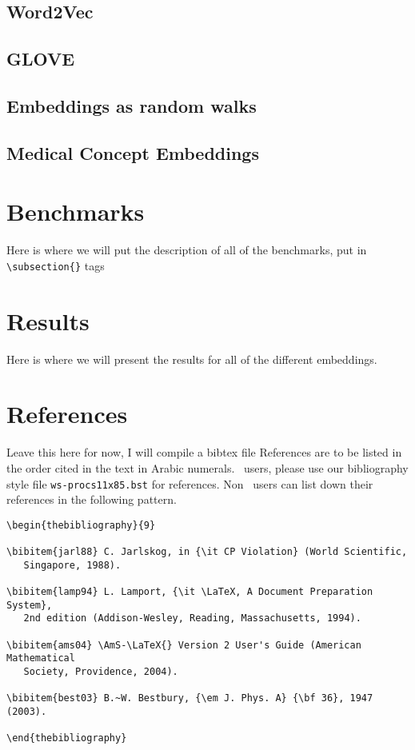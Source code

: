\documentclass{ws-procs11x85}
\begin{document}
 \subsection{Word2Vec}
 
 \subsection{GLOVE} 
 
 \subsection{Embeddings as random walks}
 
 \subsection{Medical Concept Embeddings}

\section{Benchmarks}
Here is where we will put the description of all of the benchmarks, put in \verb|\subsection{}| tags

\section{Results}
Here is where we will present the results for all of the different embeddings.

\section{References}
Leave this here for now, I will compile a bibtex file
References are to be listed in the order cited in the text in Arabic
numerals. \btex\ users, please use our bibliography style file
\verb|ws-procs11x85.bst| for references. Non \btex\ users can list
down their references in the following pattern.

\begin{verbatim}
\begin{thebibliography}{9}

\bibitem{jarl88} C. Jarlskog, in {\it CP Violation} (World Scientific,
   Singapore, 1988).

\bibitem{lamp94} L. Lamport, {\it \LaTeX, A Document Preparation System},
   2nd edition (Addison-Wesley, Reading, Massachusetts, 1994).

\bibitem{ams04} \AmS-\LaTeX{} Version 2 User's Guide (American Mathematical
   Society, Providence, 2004).

\bibitem{best03} B.~W. Bestbury, {\em J. Phys. A} {\bf 36}, 1947 (2003).

\end{thebibliography}
\end{verbatim}
\end{document}
